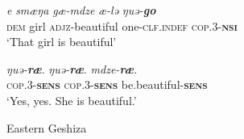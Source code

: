 \begin{exe}
    \ex\label{e:Discussion:GeshizaDialogue2}
    \begin{xlist}
        \ex\label{e:Discussion:GeshizaDialogue2:A}
        \gll \textit{e} \textit{smæŋa} \textit{gæ-mdze} \textit{æ-lə} \textit{ŋuə-\textbf{go}} \\
        \textsc{dem} girl \textsc{adjz}-beautiful one-\textsc{clf.indef} \textsc{cop.3-\textbf{nsi}} \\
        \glt `That girl is beautiful'

        \ex\label{e:Discussion:GeshizaDialogue2:B}
        \gll \textit{ŋuə-\textbf{ræ}}. \textit{ŋuə-\textbf{ræ}}. \textit{mdze-\textbf{ræ}}. \\
        \textsc{cop.3-\textbf{sens}} \textsc{cop.3-\textbf{sens}} be.beautiful-\textsc{\textbf{sens}} \\
        \glt `Yes, yes. She is beautiful.'
    \end{xlist}
    Eastern Geshiza \cite[rGyalrongic: PRC,][593]{Honkasalo2019}
\end{exe}

